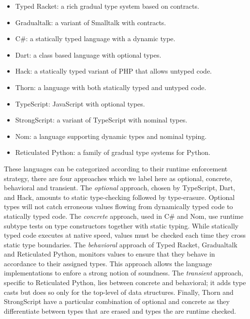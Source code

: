 \documentclass[USenglish]{tex/lipics-v2016}
\begin{document}
\begin{itemize}
 \item Typed Racket: a rich gradual type system based on contracts.
 \item Gradualtalk: a variant of Smalltalk with contracts.
 \item C\#: a statically typed language with a dynamic type.
 \item Dart: a class based language with optional types.
 \item Hack: a statically typed variant of PHP that allows untyped code.
 \item Thorn: a language with both statically typed and untyped code.
 \item TypeScript: JavaScript with optional types.
 \item StrongScript: a variant of TypeScript with nominal types.
 \item Nom: a language supporting dynamic types and nominal typing.
\item Reticulated Python: a family of gradual type systems for Python.
\end{itemize}

\noindent These languages can be categorized according to their runtime
enforcement strategy, there are four approaches which we label here as
optional, concrete, behavioral and transient. The \emph{optional} approach,
chosen by TypeScript, Dart, and Hack, amounts to static type-checking
followed by type-erasure. Optional types will not catch erroneous values
flowing from dynamically typed code to statically typed code.  The
\emph{concrete} approach, used in C\# and Nom, use runtime subtype tests on
type constructors together with static typing. While statically typed code
executes at native speed, values must be checked each time they cross static
type boundaries. The \emph{behavioral} approach of Typed Racket, Gradualtalk
and Reticulated Python, monitors values to ensure that they behave in
accordance to their assigned types.  This approach allows the language
implementations to enfore a strong notion of soundness.  The
\emph{transient} approach, specific to Reticulated Python, lies between
concrete and behavioral; it adds type casts but does so only for the
top-level of data structures. Finally, Thorn and StrongScript have a
particular combination of optional and concrete as they differentiate
between types that are erased and types the are runtime checked.
\end{document}
